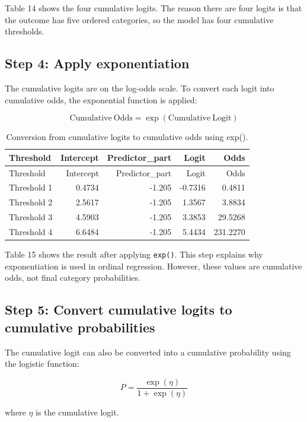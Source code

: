 \documentclass{article}
\begin{document}
Table 14 shows the four cumulative logits. The reason there are four
logits is that the outcome has five ordered categories, so the model has
four cumulative thresholds.

\subsection{Step 4: Apply
exponentiation}\label{step-4-apply-exponentiation}

The cumulative logits are on the log-odds scale. To convert each logit
into cumulative odds, the exponential function is applied:

\[
\mathrm{Cumulative\ Odds} = \exp(\mathrm{Cumulative\ Logit})
\]

\begin{longtable}[]{@{}lrrrr@{}}
\caption{Conversion from cumulative logits to cumulative odds using
exp().}\tabularnewline
\toprule\noalign{}
Threshold & Intercept & Predictor\_part & Logit & Odds \\
\midrule\noalign{}
\endfirsthead
\toprule\noalign{}
Threshold & Intercept & Predictor\_part & Logit & Odds \\
\midrule\noalign{}
\endhead
\bottomrule\noalign{}
\endlastfoot
Threshold 1 & 0.4734 & -1.205 & -0.7316 & 0.4811 \\
Threshold 2 & 2.5617 & -1.205 & 1.3567 & 3.8834 \\
Threshold 3 & 4.5903 & -1.205 & 3.3853 & 29.5268 \\
Threshold 4 & 6.6484 & -1.205 & 5.4434 & 231.2270 \\
\end{longtable}

Table 15 shows the result after applying \texttt{exp()}. This step
explains why exponentiation is used in ordinal regression. However,
these values are cumulative odds, not final category probabilities.

\subsection{Step 5: Convert cumulative logits to cumulative
probabilities}\label{step-5-convert-cumulative-logits-to-cumulative-probabilities}

The cumulative logit can also be converted into a cumulative probability
using the logistic function:

\[
P = \frac{\exp(\eta)}{1 + \exp(\eta)}
\]

where \(\eta\) is the cumulative logit.
\end{document}
